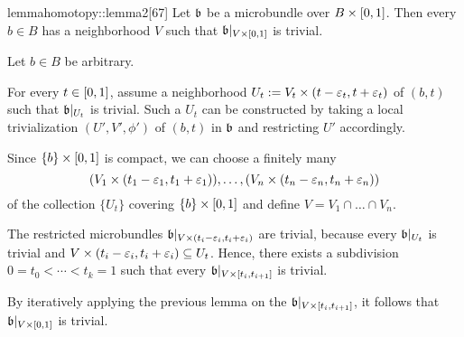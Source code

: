 \begin{mystatement}{lemma}{homotopy::lemma2}[67]
    Let $\bb$ be a microbundle over $B \times{} [0, 1]$.
    Then every $b \in B$ has a neighborhood $V$ such that $\bb[\cyl{V}]$ is trivial.
\end{mystatement}

\begin{myproof}
    Let $b \in B$ be arbitrary.

    For every $t \in [0, 1]$, assume a neighborhood
    $U_t := V_t \times (t - \varepsilon{}_t, t + \varepsilon{}_t)$ of $(b, t)$
    such that $\bb[U_t]$ is trivial.
    Such a $U_t$ can be constructed by taking
    a local trivialization $(U', V', \phi')$ of $(b, t)$ in $\bb$
    and restricting $U'$ accordingly.

    Since $\{b\} \times{} [0, 1]$ is compact, we can choose a finitely many
    \[ (V_1 \times (t_1 - \varepsilon{}_1, t_1 + \varepsilon{}_1)), \dots, (V_n \times (t_n - \varepsilon{}_n, t_n + \varepsilon{}_n)) \]
    of the collection $\{U_t\}$ covering $\{b\} \times [0, 1]$ and define $V = V_1 \cap \dots \cap V_n$.

    The restricted microbundles $\bb[V \cross (t_i - \eps_i, t_i + \eps_i)]$ are trivial, because every $\bb[U_t]$ is trivial and $V \times (t_i - \varepsilon{}_i, t_i + \varepsilon{}_i) \subseteq{} U_t$.
    Hence, there exists a subdivision $0 = t_0 < \cdots < t_k = 1$ such that every $\bb[V \cross [t_{i}, t_{i + 1}]]$ is trivial.
    
    By iteratively applying the previous lemma on the $\bb[V \cross [t_i, t_{i + 1}]]$, it follows that $\bb[\cyl{V}]$ is trivial.
\end{myproof}